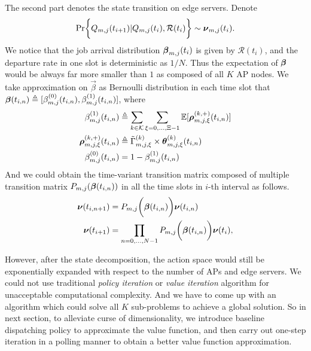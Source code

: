 The second part denotes the state transition on edge servers.
Denote
\begin{align}
    \Pr\Brace{ Q_{m,j}(t_{i+1})|Q_{m,j}(t_{i}), \mathcal{R}(t_{i}) } \sim \vecG{\nu}_{m,j}(t_{i}).
\end{align}
We notice that the job arrival distribution $\boldsymbol{\beta}_{m,j}(t_{i})$ is given by $\mathcal{R}(t_{i})$, and the departure rate in one slot is deterministic as $1/N$.
Thus the expectation of $\boldsymbol{\beta}$ would be always far more smaller than $1$ as composed of all $K$ AP nodes.
We take approximation on $\vec{\beta}$ as Bernoulli distribution in each time slot that $\boldsymbol{\beta}(t_{i,n}) \triangleq [\beta^{(0)}_{m,j}(t_{i,n}), \beta^{(1)}_{m,j}(t_{i,n})]$, where
\begin{align}
    \beta^{(1)}_{m,j}(t_{i,n}) &\triangleq \sum_{k\in\mathcal{K}} \sum_{\xi=0,\dots,\Xi-1} \mathbb{E}[\boldsymbol{\rho}^{(k,+)}_{m,j,\xi}(t_{i,n})]
    \label{eqn_0}
    \\
    \boldsymbol{\rho}^{(k,+)}_{m,j,\xi}(t_{i,n}) &\triangleq \tilde{\Gamma}^{(k)}_{m,j,\xi} \times \boldsymbol{\theta}^{(k)}_{m,j,\xi}(t_{i,n})
    \\
    \beta^{(0)}_{m,j}(t_{i,n}) &= 1-\beta^{(1)}_{m,j}(t_{i,n})
\end{align}
And we could obtain the time-variant transition matrix composed of multiple transition matrix $P_{m,j}(\boldsymbol{\beta}(t_{i,n}))$ in all the time slots in $i$-th interval as follows.
\begin{align}
    \boldsymbol{\nu}(t_{i,n+1}) &= P_{m,j}\bigg(\boldsymbol{\beta}(t_{i,n})\bigg) \boldsymbol{\nu}(t_{i,n})
    \\
    \boldsymbol{\nu}(t_{i+1}) &= \prod_{n=0,\dots,N-1} P_{m,j}\bigg(\boldsymbol{\beta}(t_{i,n})\bigg) \boldsymbol{\nu}(t_{i}),
    \label{eqn_4}
\end{align}

However, after the state decomposition, the action space would still be exponentially expanded with respect to the number of APs and edge servers. We could not use traditional \emph{policy iteration} or \emph{value iteration} algorithm \cite{sutton1998introduction} for unacceptable computational complexity.
And we have to come up with an algorithm which could solve all $K$ sub-problems to achieve a global solution.
So in next section, to alleviate curse of dimensionality, we introduce baseline dispatching policy to approximate the value function, and then carry out one-step iteration in a polling manner to obtain a better value function approximation.
